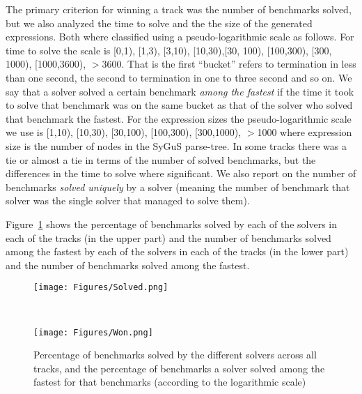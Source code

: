 The primary criterion for winning a track was the number of benchmarks solved, but we also analyzed the time to solve and the the size of the generated expressions. Both where classified using a pseudo-logarithmic scale as follows.
For time to solve the scale is [0,1), [1,3), [3,10), [10,30),[30, 100), [100,300), [300, 1000), [1000,3600), $>$3600. That is the first ``bucket'' refers to termination in less than one second, the second to termination in one to three second and so on. We say that a solver solved a certain benchmark \emph{among the fastest} if the time it took to solve that benchmark was on the same bucket as that of the solver who solved that benchmark the fastest. 
For the expression sizes the pseudo-logarithmic scale we use is [1,10), [10,30), [30,100), [100,300), [300,1000), $>$1000 where expression size is the number of nodes in the SyGuS parse-tree.
In some tracks there was a tie or almost a tie in terms of the number of solved benchmarks, but the differences in the time to solve where significant.
We also report on the number of benchmarks \emph{solved uniquely} by a solver (meaning the number of benchmark that solver was the single solver that managed to solve them).



Figure~\ref{fig:resultsPerTrack} shows the percentage of benchmarks solved by each of the solvers in each of the tracks (in the upper part) and the number of benchmarks solved among the fastest by each of the solvers in each of the tracks (in the lower part) and the number of benchmarks solved among the fastest. 

\begin{figure}
	\begin{center}
		\begin{minipage}{1\textwidth}
			\centering
			\texttt{[image: Figures/Solved.png]}
		\end{minipage}
		\\
		\vspace{2mm}
		\begin{minipage}{1\textwidth}
			\centering
			\texttt{[image: Figures/Won.png]}
		\end{minipage}
	\end{center}
	\caption{Percentage of benchmarks solved by the different solvers across all tracks, and the percentage of benchmarks a solver solved among the fastest for that benchmarks (according to the logarithmic scale)}\label{fig:resultsPerTrack}	
\end{figure}


